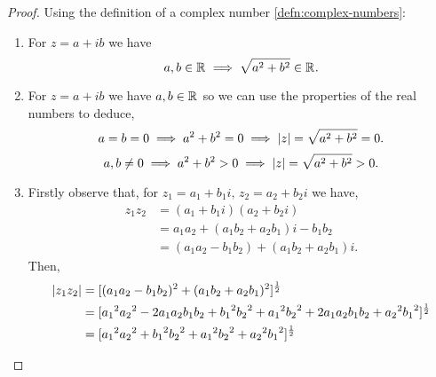 \documentclass[../MathsNotesBase.tex]{subfiles}
\begin{document}
{		\medskip
		\begin{proof}\nl
			Using the definition of a complex number \ref{defn:complex-numbers}:
			\begin{enumerate}[label=(\roman*)]
				\item{For ${ z = a + ib }$ we have 
					\[  a,b \in \mathbb{R}^{} \implies \sqrt{a^2 + b^2} \in \mathbb{R}^{}. \]
				}
				\item{For ${ z = a + ib }$ we have ${ a,b \in \mathbb{R}^{} }$ so we can use the properties of the real numbers to deduce,
					\[ a = b = 0 \implies a^2 + b^2 = 0 \implies \left\lvert z\right\rvert = \sqrt{a^2 + b^2} = 0. \]
					\[ a,b \neq 0 \implies a^2 + b^2 > 0 \implies \left\lvert z\right\rvert = \sqrt{a^2 + b^2} > 0.  \]
				}
				\item{Firstly observe that, for ${ z_1 = a_1 + b_1 i, \, z_2 = a_2 + b_2 i }$ we have,
					\[\begin{aligned}
						z_1 z_2 &= (a_1 + b_1 i)(a_2 + b_2 i) \\
						&= a_1 a_2 + (a_1 b_2 + a_2 b_1)i - b_1 b_2 \\
						&= (a_1 a_2 - b_1 b_2) + (a_1 b_2 + a_2 b_1)i.
					\end{aligned}\]
					Then,
					\[\begin{aligned}
						\modulus{z_1 z_2} &= [(a_1 a_2 - b_1 b_2)^2 + (a_1 b_2 + a_2 b_1)^2]^{\frac{1}{2}} \\
						&= [{a_1}^2 {a_2}^2 - 2 a_1 a_2 b_1 b_2 + {b_1}^2 {b_2}^2 + {a_1}^2 {b_2}^2 + 2 a_1 a_2 b_1 b_2 + {a_2}^2 {b_1}^2]^{\frac{1}{2}} \\
						&= [{a_1}^2 {a_2}^2 + {b_1}^2 {b_2}^2 + {a_1}^2 {b_2}^2 + {a_2}^2 {b_1}^2]^{\frac{1}{2}} \\

\end{aligned}\]}
\end{enumerate}
\end{proof}}
\end{document}
